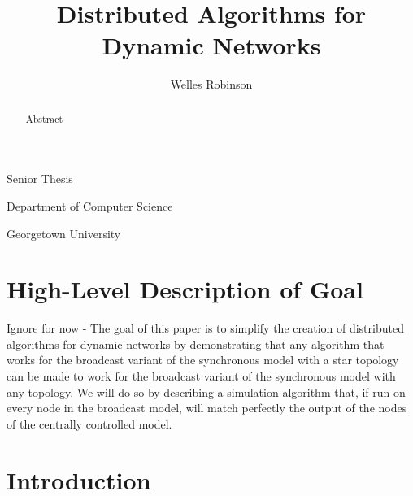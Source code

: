 \documentclass[english]{article}
\begin{document}
\title{Distributed Algorithms for Dynamic Networks}

\maketitle
\begin{center}\author{Welles Robinson}\end{center}
\noindent \begin{center}Senior Thesis\par\end{center}
\noindent \begin{center}Department of Computer
Science\par\end{center}
\noindent \begin{center}Georgetown University\par\end{center}

\newtheorem{definition} {Definition}
\newcommand{\mydef}[1]{\begin{definition}#1\end{definition}}

\begin{abstract}
Abstract
\end{abstract}

\section{High-Level Description of Goal}
Ignore for now - The goal of this paper is to simplify the creation of distributed algorithms for dynamic networks by demonstrating that any algorithm that works for the broadcast variant of the synchronous model with a star topology can be made to work for the broadcast variant of the synchronous model with any topology. 
We will do so by describing a simulation algorithm that, if run on every node in the broadcast model, will match perfectly the output of the nodes of the centrally controlled model.

\section{Introduction}
\end{document}

